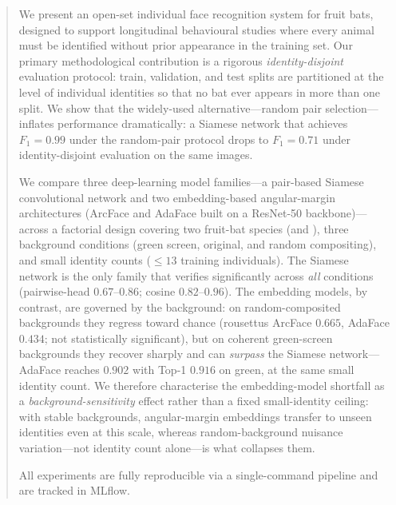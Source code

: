 \begin{abstract}
We present an open-set individual face recognition system for fruit bats, designed to
support longitudinal behavioural studies where every animal must be identified without
prior appearance in the training set.
Our primary methodological contribution is a rigorous \emph{identity-disjoint} evaluation
protocol: train, validation, and test splits are partitioned at the level of individual
identities so that no bat ever appears in more than one split.
We show that the widely-used alternative---random pair selection---inflates performance
dramatically: a Siamese network that achieves $F_1 = 0.99$ under the random-pair protocol
drops to $F_1 = 0.71$ under identity-disjoint evaluation on the same images.

We compare three deep-learning model families---a pair-based Siamese convolutional
network and two embedding-based angular-margin architectures (ArcFace and AdaFace built
on a ResNet-50 backbone)---across a factorial design covering two fruit-bat species
(\rousettus and \mauritius), three background conditions (green screen, original, and
random compositing), and small identity counts ($\le 13$ training individuals).
The Siamese network is the only family that verifies significantly across \emph{all}
conditions (pairwise-head \rocauc $0.67$--$0.86$; cosine \rocauc $0.82$--$0.96$).  The
embedding models, by contrast, are governed by the background: on random-composited
backgrounds they regress toward chance (rousettus ArcFace $0.665$, AdaFace $0.434$;
not statistically significant), but on coherent green-screen backgrounds they recover
sharply and can \emph{surpass} the Siamese network---AdaFace reaches \rocauc $0.902$ with
Top-1 $0.916$ on \mauritius green, at the same small identity count.
We therefore characterise the embedding-model shortfall as a \emph{background-sensitivity}
effect rather than a fixed small-identity ceiling: with stable backgrounds, angular-margin
embeddings transfer to unseen identities even at this scale, whereas random-background
nuisance variation---not identity count alone---is what collapses them.

All experiments are fully reproducible via a single-command pipeline and are tracked in
MLflow.
\end{abstract}
